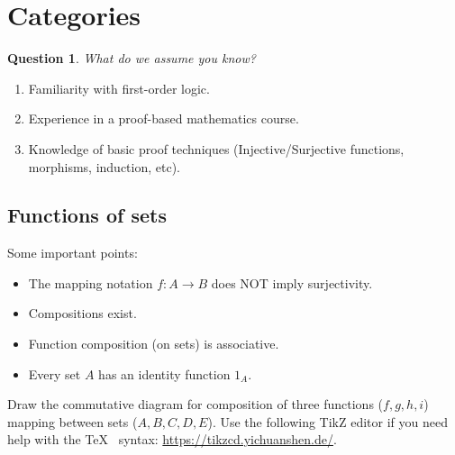 \documentclass[12pt, reqno]{amsart}
\theoremstyle{definition}
\theoremstyle{definition}
\numberwithin{theorem}{section}
\theoremstyle{plain}
\newtheorem{question}[theorem]{Question}
\theoremstyle{definition}
\theoremstyle{remark}
\renewcommand{\'}{\hspace{0.5mm}'}			%
\begin{document}
\thispagestyle{fancy}

\tableofcontents

\section{Categories}


\begin{question}
    What do we assume you know?
\end{question}

\begin{enumerate}
    \item Familiarity with first-order logic. 
    \item Experience in a proof-based mathematics course. 
    \item Knowledge of basic proof techniques (Injective/Surjective functions, morphisms, induction, etc). 
\end{enumerate}

\setcounter{subsection}{1}
\subsection{Functions of sets}

Some important points: 

\begin{itemize}
    \item The mapping notation $f:A \to B$ does NOT imply surjectivity. 
    \item Compositions exist. 
    \item Function composition (on sets) is associative. 
    \item Every set $A$ has an identity function $1_A$. 
\end{itemize}

\begin{e}
	Draw the commutative diagram for composition of three functions ($f,g,h,i$) mapping between sets ($A,B,C,D,E$). Use the following TikZ editor if you need help with the \TeX~ syntax: \url{https://tikzcd.yichuanshen.de/}. 
\end{e}

\begin{center}
\end{center}
\end{document}
